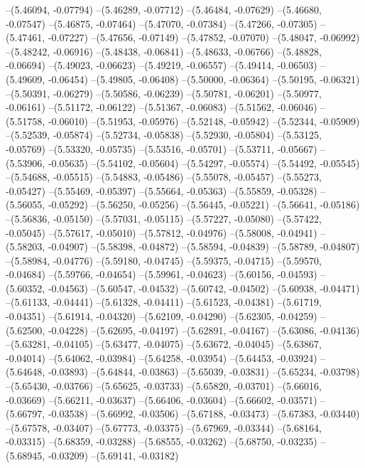 --(5.46094, -0.07794)
--(5.46289, -0.07712)
--(5.46484, -0.07629)
--(5.46680, -0.07547)
--(5.46875, -0.07464)
--(5.47070, -0.07384)
--(5.47266, -0.07305)
--(5.47461, -0.07227)
--(5.47656, -0.07149)
--(5.47852, -0.07070)
--(5.48047, -0.06992)
--(5.48242, -0.06916)
--(5.48438, -0.06841)
--(5.48633, -0.06766)
--(5.48828, -0.06694)
--(5.49023, -0.06623)
--(5.49219, -0.06557)
--(5.49414, -0.06503)
--(5.49609, -0.06454)
--(5.49805, -0.06408)
--(5.50000, -0.06364)
--(5.50195, -0.06321)
--(5.50391, -0.06279)
--(5.50586, -0.06239)
--(5.50781, -0.06201)
--(5.50977, -0.06161)
--(5.51172, -0.06122)
--(5.51367, -0.06083)
--(5.51562, -0.06046)
--(5.51758, -0.06010)
--(5.51953, -0.05976)
--(5.52148, -0.05942)
--(5.52344, -0.05909)
--(5.52539, -0.05874)
--(5.52734, -0.05838)
--(5.52930, -0.05804)
--(5.53125, -0.05769)
--(5.53320, -0.05735)
--(5.53516, -0.05701)
--(5.53711, -0.05667)
--(5.53906, -0.05635)
--(5.54102, -0.05604)
--(5.54297, -0.05574)
--(5.54492, -0.05545)
--(5.54688, -0.05515)
--(5.54883, -0.05486)
--(5.55078, -0.05457)
--(5.55273, -0.05427)
--(5.55469, -0.05397)
--(5.55664, -0.05363)
--(5.55859, -0.05328)
--(5.56055, -0.05292)
--(5.56250, -0.05256)
--(5.56445, -0.05221)
--(5.56641, -0.05186)
--(5.56836, -0.05150)
--(5.57031, -0.05115)
--(5.57227, -0.05080)
--(5.57422, -0.05045)
--(5.57617, -0.05010)
--(5.57812, -0.04976)
--(5.58008, -0.04941)
--(5.58203, -0.04907)
--(5.58398, -0.04872)
--(5.58594, -0.04839)
--(5.58789, -0.04807)
--(5.58984, -0.04776)
--(5.59180, -0.04745)
--(5.59375, -0.04715)
--(5.59570, -0.04684)
--(5.59766, -0.04654)
--(5.59961, -0.04623)
--(5.60156, -0.04593)
--(5.60352, -0.04563)
--(5.60547, -0.04532)
--(5.60742, -0.04502)
--(5.60938, -0.04471)
--(5.61133, -0.04441)
--(5.61328, -0.04411)
--(5.61523, -0.04381)
--(5.61719, -0.04351)
--(5.61914, -0.04320)
--(5.62109, -0.04290)
--(5.62305, -0.04259)
--(5.62500, -0.04228)
--(5.62695, -0.04197)
--(5.62891, -0.04167)
--(5.63086, -0.04136)
--(5.63281, -0.04105)
--(5.63477, -0.04075)
--(5.63672, -0.04045)
--(5.63867, -0.04014)
--(5.64062, -0.03984)
--(5.64258, -0.03954)
--(5.64453, -0.03924)
--(5.64648, -0.03893)
--(5.64844, -0.03863)
--(5.65039, -0.03831)
--(5.65234, -0.03798)
--(5.65430, -0.03766)
--(5.65625, -0.03733)
--(5.65820, -0.03701)
--(5.66016, -0.03669)
--(5.66211, -0.03637)
--(5.66406, -0.03604)
--(5.66602, -0.03571)
--(5.66797, -0.03538)
--(5.66992, -0.03506)
--(5.67188, -0.03473)
--(5.67383, -0.03440)
--(5.67578, -0.03407)
--(5.67773, -0.03375)
--(5.67969, -0.03344)
--(5.68164, -0.03315)
--(5.68359, -0.03288)
--(5.68555, -0.03262)
--(5.68750, -0.03235)
--(5.68945, -0.03209)
--(5.69141, -0.03182)
